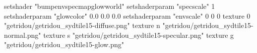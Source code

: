 setshader "bumpenvspecmapglowworld"
setshaderparam "specscale" 1
setshaderparam "glowcolor" 0.0 0.0 0.0
setshaderparam "envscale" 0 0 0
texture 0 "getridou/getridou_sydtile15-diffuse.png"
texture n "getridou/getridou_sydtile15-normal.png"
texture s "getridou/getridou_sydtile15-specular.png"
texture g "getridou/getridou_sydtile15-glow.png"
